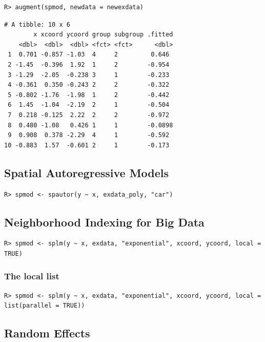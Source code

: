 \documentclass{article}
\begin{document}
\begin{verbatim}
R> augment(spmod, newdata = newexdata)
\end{verbatim}

\begin{verbatim}
# A tibble: 10 x 6
        x xcoord ycoord group subgroup .fitted
    <dbl>  <dbl>  <dbl> <fct> <fct>      <dbl>
 1  0.701 -0.857 -1.03  4     2         0.646 
 2 -1.45  -0.396  1.92  1     2        -0.954 
 3 -1.29  -2.05  -0.238 3     1        -0.233 
 4 -0.361  0.350 -0.243 2     2        -0.322 
 5 -0.802 -1.76  -1.98  1     2        -0.442 
 6  1.45  -1.04  -2.19  2     1        -0.504 
 7  0.218 -0.125  2.22  2     2        -0.972 
 8  0.480 -1.08   0.426 1     1        -0.0898
 9  0.908  0.378 -2.29  4     1        -0.592 
10 -0.883  1.57  -0.601 2     1        -0.173 
\end{verbatim}

\hypertarget{spatial-autoregressive-models}{%
\subsection{Spatial Autoregressive
Models}\label{spatial-autoregressive-models}}

\begin{verbatim}
R> spmod <- spautor(y ~ x, exdata_poly, "car")
\end{verbatim}

\hypertarget{neighborhood-indexing-for-big-data}{%
\subsection{Neighborhood Indexing for Big
Data}\label{neighborhood-indexing-for-big-data}}

\begin{verbatim}
R> spmod <- splm(y ~ x, exdata, "exponential", xcoord, ycoord, local = TRUE)
\end{verbatim}

\hypertarget{the-local-list}{%
\subsubsection{The local list}\label{the-local-list}}

\begin{verbatim}
R> spmod <- splm(y ~ x, exdata, "exponential", xcoord, ycoord, local = list(parallel = TRUE))
\end{verbatim}

\hypertarget{random-effects}{%
\subsection{Random Effects}\label{random-effects}}
\end{document}
